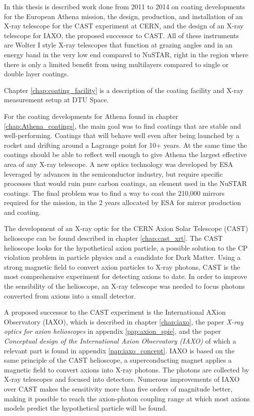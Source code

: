 In this thesis is described work done from 2011 to 2014 on coating developments for the European Athena mission, the design, production, and installation of an X-ray telescope for the CAST experiment at CERN, and the design of an X-ray telescope for IAXO, the proposed successor to CAST. All of these instruments are Wolter I style X-ray telescopes that function at grazing angles and in an energy band in the very low end compared to NuSTAR, right in the region where there is only a limited benefit from using multilayers compared to single or double layer coatings.

Chapter \ref{chap:coating_facility} is a description of the coating facility and X-ray measurement setup at DTU Space. %

For the coating developments for Athena found in chapter \ref{chap:Athena_coatings}, the main goal was to find coatings that are stable and well-performing. Coatings that will behave well even after being launched by a rocket and drifting around a Lagrange point for 10+ years. At the same time the coatings should be able to reflect well enough to give Athena the largest effective area of any X-ray telescope. A new optics technology was developed by ESA leveraged by advances in the semiconductor industry, but require specific processes that would ruin pure carbon coatings, an element used in the NuSTAR coatings. The final problem was to find a way to coat the 210,000 mirrors required for the mission, in the 2 years allocated by ESA for mirror production and coating.

The development of an X-ray optic for the CERN Axion Solar Telescope (CAST) helioscope can be found described in chapter \ref{chap:cast_xrt}. The CAST helioscope looks for the hypothetical axion particle, a possible solution to the CP violation problem in particle physics and a candidate for Dark Matter. Using a strong magnetic field to convert axion particles to X-ray photons, CAST is the most comprehensive experiment for detecting axions to date. In order to improve the sensibility of the helioscope, an X-ray telescope was needed to focus photons converted from axions into a small detector.

A proposed successor to the CAST experiment is the International AXion Observatory (IAXO), which is described in chapter \ref{chap:iaxo}, the paper \emph{X-ray optics for axion helioscopes} in appendix \ref{pap:axion_spie}, and the paper \emph{Conceptual design of the International Axion Observatory (IAXO)} of which a relevant part is found in appendix \ref{pap:iaxo_concept}. IAXO is based on the same principle of the CAST helioscope, a superconducting magnet applies a magnetic field to convert axions into X-ray photons. The photons are collected by X-ray telescopes and focused into detectors. Numerous improvements of IAXO over CAST makes the sensitivity more than five orders of magnitude better, making it possible to reach the axion-photon coupling range at which most axions models predict the hypothetical particle will be found.

